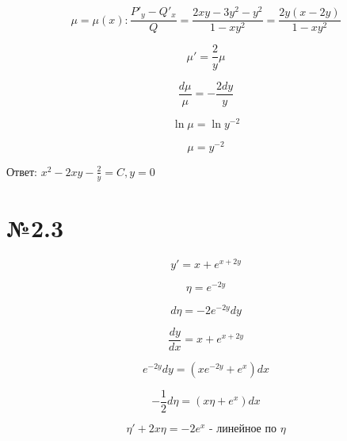 \documentclass{article}
\begin{document}
\begin{equation*}
\mu = \mu(x): \frac{P'_y - Q'_x}{Q} = \frac{2xy - 3y^2 - y^2}{1 - xy^2} = \frac{2y(x - 2y)}{1 - xy^2}
\end{equation*}

\begin{equation*}
    \mu' = \frac{2}{y}\mu
\end{equation*}

\begin{equation*}
    \frac{d\mu}{\mu} = - \frac{2dy}{y}
\end{equation*}

\begin{equation*}
    \ln{\mu} = \ln{y^{-2}}
\end{equation*}

\begin{equation*}
    \mu = y^{-2}
\end{equation*}

Ответ: $ x^2 - 2xy - \frac{2}{y} = C, y = 0$

\section*{№2.3}

\begin{equation*}
    y' = x + e^{x + 2y}
\end{equation*}

\begin{equation*}
   \eta = e^{-2y} 
\end{equation*}

\begin{equation*}
    d\eta = -2e^{-2y}dy
\end{equation*}

\begin{equation*}
    \frac{dy}{dx} = x + e^{x + 2y}
\end{equation*}

\begin{equation*}
    e^{-2y}dy = (xe^{-2y} + e^x)dx
\end{equation*}

\begin{equation*}
    -\frac{1}{2}d\eta = (x\eta + e^x)dx
\end{equation*}

\begin{equation*}
    \eta' + 2x\eta = -2e^x \text{ - линейное по } \eta
\end{equation*}
\end{document}
